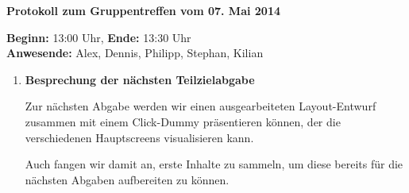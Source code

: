 \documentclass[a4paper]{article}
\newcommand{\changefont}[3]{
\fontfamily{#1} \fontseries{#2} \fontshape{#3} \selectfont}
\newcommand{\TOP}[1]{\item \textbf{#1}\par}
\begin{document}
\changefont{cmss}{m}{n} %


\begin{center}
\textbf{\Large Protokoll zum Gruppentreffen vom 07. Mai 2014}
\end{center}
\vspace{3mm}

\textbf{Beginn:} 13:00 Uhr, \textbf{Ende:} 13:30 Uhr\\
\textbf{Anwesende:} Alex, Dennis, Philipp, Stephan, Kilian

\vspace{5mm}

\begin{enumerate}


\TOP{Besprechung der nächsten Teilzielabgabe}

Zur nächsten Abgabe werden wir einen ausgearbeiteten Layout-Entwurf zusammen mit einem Click-Dummy präsentieren können, der die verschiedenen Hauptscreens visualisieren kann.

Auch fangen wir damit an, erste Inhalte zu sammeln, um diese bereits für die nächsten Abgaben aufbereiten zu können.



\end{enumerate}


\makeatletter
\def\footrule{{
  \vskip-\footruleskip\vskip-\footrulewidth
  \color{\footrulecolor}
  \hrule\@width\headwidth\@height
  \footrulewidth\vskip\footruleskip
}}
\makeatother
\renewcommand{\footrulewidth}{3pt}
\newcommand{\footrulecolor}{dgreen}
\end{document}
